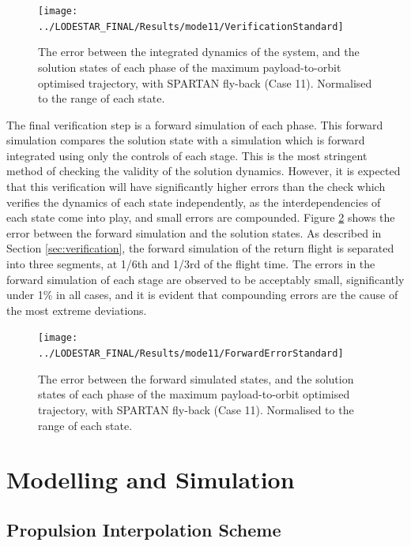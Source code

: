\begin{figure}[ht]
	\centering
	\texttt{[image: ../LODESTAR\_FINAL/Results/mode11/VerificationStandard]}
	\caption{The error between the integrated dynamics of the system, and the solution states of each phase of the maximum payload-to-orbit optimised trajectory, with SPARTAN fly-back (Case 11). Normalised to the range of each state.}
	\label{fig:VerificationStandard}
\end{figure}

The final verification step is a forward simulation of each phase. This forward simulation compares the solution state with a simulation which is forward integrated using only the controls of each stage. This is the most stringent method of checking the validity of the solution dynamics. However, it is expected that this verification will have significantly higher errors than the check which verifies the dynamics of each state independently, as the interdependencies of each state come into play, and small errors are compounded. Figure \ref{fig:ForwardErrorStandard} shows the error between the forward simulation and the solution states. As described in Section \ref{sec:verification}, the forward simulation of the return flight is separated into three segments, at 1/6th and 1/3rd of the flight time. The errors in the forward simulation of each stage are observed to be acceptably small, significantly under 1\% in all cases, and it is evident that compounding errors are the cause of the most extreme deviations. 

\begin{figure}[ht]
	\centering
	\texttt{[image: ../LODESTAR\_FINAL/Results/mode11/ForwardErrorStandard]}
	\caption{The error between the forward simulated states, and the solution states of each phase of the maximum payload-to-orbit optimised trajectory, with SPARTAN fly-back (Case 11). Normalised to the range of each state.}
	\label{fig:ForwardErrorStandard}
\end{figure}



\chapter{Modelling and Simulation}\label{Appendix:sim}
\section{Propulsion Interpolation Scheme}

